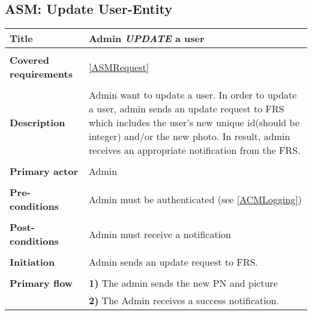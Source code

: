 \documentclass[a4paper,11pt]{article}
\begin{document}
\subsection{ASM: Update User-Entity}

\begin{tabular}{|p{3.5cm}|p{11.5cm}|} \hline 
    \textbf{Title} &   Admin \emph{UPDATE} a user 
   
    \\ \hline \rowcolor{Gray} & \\ \hline 
    
    \textbf{Covered requirements} &  \ref{ASMRequest}   
    
    \\ \hline \rowcolor{Gray} & \\ \hline 
   
    \textbf{Description} &  Admin want to update a user. In order to update a user, admin sends an update request to FRS which includes the user's new unique id(should be integer) and/or the new photo. In result, admin receives an appropriate notification from the FRS. 
   
    \\ \hline \rowcolor{Gray} & \\ \hline 
   
    \textbf{Primary actor} & Admin   
   
    \\ \hline \rowcolor{Gray} & \\ \hline  
   
    \textbf{Pre-conditions} &   Admin must be authenticated (see \ref{ACMLogging})
   
    \\ \hline \rowcolor{Gray} & \\ \hline 
   
    \textbf{Post-conditions} &   Admin must receive a notification 
   
    \\ \hline \rowcolor{Gray} & \\ \hline  
   
    \textbf{Initiation} & Admin sends an update request to FRS. 
   
    \\ \hline \rowcolor{Gray} & \\ \hline  
   
    \textbf{Primary flow} &  
    \textbf{1)} The admin sends the new PN and picture \\& 
    \textbf{2)} The Admin receives a success notification. 
   

\end{tabular}
\end{document}
